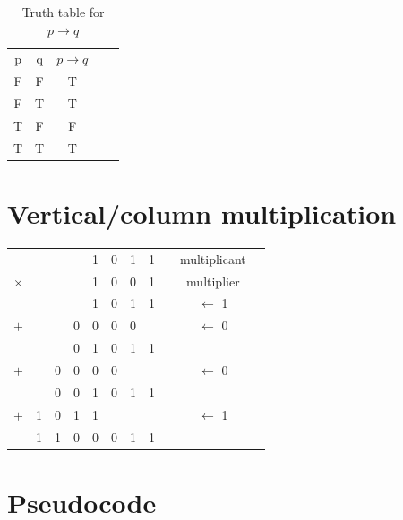 \documentclass[12pt, letterpaper, oneside]{article}
\begin{document}
\begin{table}[H]
  \centering
  \begin{tabular}{|c|c||c|ll}
    \cline{1-3}
    p & q & $p \rightarrow q$ &  & \\ [1ex] \cline{1-3}
    F & F & T                 &  & \\ [0.5ex] \cline{1-3}
    F & T & T                 &  & \\ [0.5ex] \cline{1-3}
    T & F & F                 &  & \\ [0.5ex] \cline{1-3}
    T & T & T                 &  & \\ [0.5ex] \cline{1-3}
  \end{tabular}
  \caption{Truth table for $p \rightarrow q$}
\end{table}

\section{Vertical/column multiplication}

\begin{tabular}{ccccccccccc}
           &   &   &   & 1 & 0 & 1 & 1 &  & multiplicant   \\
  $\times$ &   &   &   & 1 & 0 & 0 & 1 &  & multiplier     \\
  \hline
           &   &   &   & 1 & 0 & 1 & 1 &  & $\leftarrow$ 1 \\
  $+$      &   &   & 0 & 0 & 0 & 0 &   &  & $\leftarrow$ 0 \\
  \hline
           &   &   & 0 & 1 & 0 & 1 & 1 &  &                \\
  $+$      &   & 0 & 0 & 0 & 0 &   &   &  & $\leftarrow$ 0 \\
  \hline
           &   & 0 & 0 & 1 & 0 & 1 & 1 &  &                \\
  $+$      & 1 & 0 & 1 & 1 &   &   &   &  & $\leftarrow$ 1 \\
  \hline
           & 1 & 1 & 0 & 0 & 0 & 1 & 1 &  &                \\
\end{tabular}

\section{Pseudocode}
\end{document}
